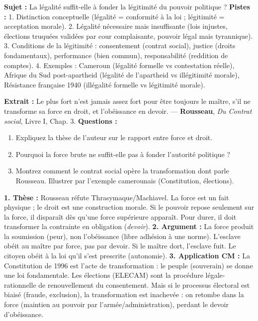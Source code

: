 \documentclass[11pt]{article}
\begin{document}
\begin{exercice}
\textbf{Sujet :} \og La légalité suffit-elle à fonder la légitimité du pouvoir politique ? \fg
\textbf{Pistes :} 1. Distinction conceptuelle (légalité = conformité à la loi ; légitimité = acceptation morale). 2. Légalité nécessaire mais insuffisante (lois injustes, élections truquées validées par cour complaisante, pouvoir légal mais tyrannique). 3. Conditions de la légitimité : consentement (contrat social), justice (droits fondamentaux), performance (bien commun), responsabilité (reddition de comptes). 4. Exemples : Cameroun (légalité formelle vs contestation réelle), Afrique du Sud post-apartheid (légalité de l'apartheid vs illégitimité morale), Résistance française 1940 (illégalité formelle vs légitimité morale).
\end{exercice}

\begin{exercice}
\textbf{Extrait :} \og Le plus fort n'est jamais assez fort pour être toujours le maître, s'il ne transforme sa force en droit, et l'obéissance en devoir. \fg — \textbf{Rousseau}, \emph{Du Contrat social}, Livre I, Chap. 3.
\textbf{Questions :}
\begin{enumerate}
    \item Expliquez la thèse de l'auteur sur le rapport entre force et droit.
    \item Pourquoi la force brute ne suffit-elle pas à fonder l'autorité politique ?
    \item Montrez comment le contrat social opère la \og transformation \fg dont parle Rousseau. Illustrer par l'exemple camerounais (Constitution, élections).
\end{enumerate}
\end{exercice}

\begin{corrige}
\textbf{1. Thèse :} Rousseau réfute Thrasymaque/Machiavel. La force est un fait physique ; le droit est une construction morale. Si le pouvoir repose seulement sur la force, il disparaît dès qu'une force supérieure apparaît. Pour durer, il doit transformer la contrainte en obligation (\emph{devoir}).
\textbf{2. Argument :} La force produit la soumission (peur), non l'obéissance (libre adhésion à une norme). L'esclave obéit au maître par force, pas par devoir. Si le maître dort, l'esclave fuit. Le citoyen obéit à la loi qu'il s'est prescrite (autonomie).
\textbf{3. Application CM :} La Constitution de 1996 est l'acte de \og transformation \fg : le peuple (souverain) se donne une loi fondamentale. Les élections (ELECAM) sont la procédure légale-rationnelle de renouvellement du consentement. Mais si le processus électoral est biaisé (fraude, exclusion), la \og transformation \fg est inachevée : on retombe dans la force (maintien au pouvoir par l'armée/administration), perdant le \og devoir \fg d'obéissance.
\end{corrige}
\end{document}
